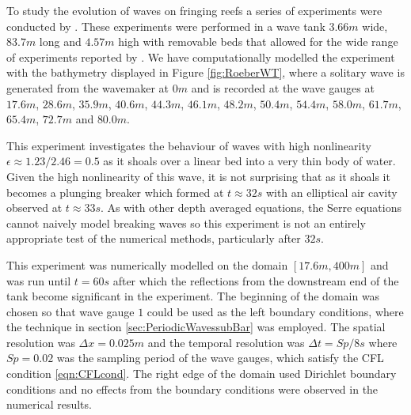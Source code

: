 


To study the evolution of waves on fringing reefs a series of experiments were conducted by \citet{Roeber-2010}. These experiments were performed in a wave tank $3.66m$ wide, $83.7m$ long and $4.57m$ high with removable beds that allowed for the wide range of experiments reported by \citet{Roeber-2010}. We have computationally modelled the experiment with the bathymetry displayed in Figure \ref{fig:RoeberWT}, where a solitary wave is generated from the wavemaker at $0m$ and is recorded at the wave gauges at $17.6m$, $28.6m$, $35.9m$, $40.6m$, $44.3m$, $46.1m$, $48.2m$, $50.4m$, $54.4m$, $58.0m$, $61.7m$, $65.4m$, $72.7m$ and $80.0m$.

This experiment investigates the behaviour of waves with high nonlinearity $ \epsilon \approx 1.23/2.46 = 0.5$ as it shoals over a linear bed into a very thin body of water. Given the high nonlinearity of this wave, it is not surprising that as it shoals it becomes a plunging breaker which formed at $t \approx 32s$ with an elliptical air cavity observed at $t \approx 33s$. As with other depth averaged equations, the Serre equations cannot naively model breaking waves so this experiment is not an entirely appropriate test of the numerical methods, particularly after $32s$.

This experiment was numerically modelled on the domain $[17.6m , 400m]$ and was run until $t = 60s$ after which the reflections from the downstream end of the tank become significant in the experiment. The beginning of the domain was chosen so that wave gauge $1$ could be used as the left boundary conditions, where the technique in section \ref{sec:PeriodicWavessubBar} was employed. The spatial resolution was $\Delta x = 0.025m$ and the temporal resolution was $\Delta t = Sp / 8 s$ where $Sp = 0.02$ was the sampling period of the wave gauges, which satisfy the CFL condition \eqref{eqn:CFLcond}. The right edge of the domain used Dirichlet boundary conditions and no effects from the boundary conditions were observed in the numerical results. 



